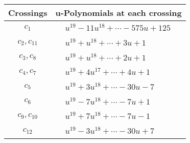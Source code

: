 \documentclass[1p]{elsarticle_modified}
\theoremstyle{definition}
\begin{document}
\begin{tabular}{m{50pt}|m{274pt}}
Crossings & \hspace{64pt}u-Polynomials at each crossing \\
\hline $$\begin{aligned}c_{1}\end{aligned}$$&$\begin{aligned}
&u^{19}-11 u^{18}+\cdots-575 u+125
\end{aligned}$\\
\hline $$\begin{aligned}c_{2},c_{11}\end{aligned}$$&$\begin{aligned}
&u^{19}+u^{18}+\cdots+3 u+1
\end{aligned}$\\
\hline $$\begin{aligned}c_{3},c_{8}\end{aligned}$$&$\begin{aligned}
&u^{19}+u^{18}+\cdots+2 u+1
\end{aligned}$\\
\hline $$\begin{aligned}c_{4},c_{7}\end{aligned}$$&$\begin{aligned}
&u^{19}+4 u^{17}+\cdots+4 u+1
\end{aligned}$\\
\hline $$\begin{aligned}c_{5}\end{aligned}$$&$\begin{aligned}
&u^{19}+3 u^{18}+\cdots-30 u-7
\end{aligned}$\\
\hline $$\begin{aligned}c_{6}\end{aligned}$$&$\begin{aligned}
&u^{19}-7 u^{18}+\cdots-7 u+1
\end{aligned}$\\
\hline $$\begin{aligned}c_{9},c_{10}\end{aligned}$$&$\begin{aligned}
&u^{19}+7 u^{18}+\cdots-7 u-1
\end{aligned}$\\
\hline $$\begin{aligned}c_{12}\end{aligned}$$&$\begin{aligned}
&u^{19}-3 u^{18}+\cdots-30 u+7
\end{aligned}$\\
\hline
\end{tabular}\\~\\
\end{document}
